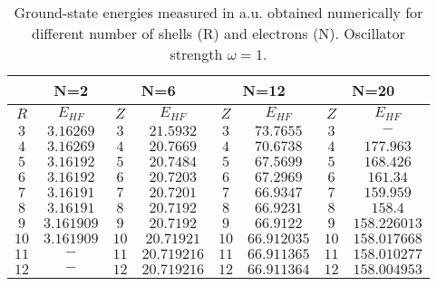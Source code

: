 \documentclass[twoside,english]{uiofysmaster}
\theoremstyle{definition}
\begin{document}
\begin{table}[h!]
	\begin{center}
		\begin{tabular}{|c c| c c| c c| c c|}
			\hline
			\multirow{2}{*}{} & 
			\multicolumn{1}{c}{N=2} \vline& 
			\multicolumn{2}{c}{N=6} \vline&
			\multicolumn{2}{c}{N=12} \vline&
			\multicolumn{2}{c}{N=20} \vline\\
			\hline
			$R$  & $E_{HF}$ & $Z$ & $E_{HF}$ & $Z$  & $E_{HF}$ &$Z$ &  $E_{HF}$  \\
			\hline
			$  3 $   & $3.16269$  &$ 3 $  & $21.5932$    &$  3 $   & $73.7655$     &$ 3$  & $-          $   \\
			$  4 $   & $3.16269$  &$ 4 $  & $20.7669$    &$  4 $   & $70.6738$     &$ 4$  & $177.963    $   \\
			$  5 $   & $3.16192$  &$ 5 $  & $20.7484$    &$  5 $   & $67.5699$     &$ 5$  & $168.426    $   \\
			$  6 $   & $3.16192$  &$ 6 $  & $20.7203$    &$  6 $   & $67.2969$     &$ 6$  & $161.34     $   \\
			$  7 $   & $3.16191$  &$ 7 $  & $20.7201$    &$  7 $   & $66.9347$     &$ 7$  & $159.959    $   \\
			$  8 $   & $3.16191$  &$ 8 $  & $20.7192$    &$  8 $   & $66.9231$     &$ 8$  & $158.4      $   \\
			$  9 $   & $3.161909$ &$ 9 $  & $20.7192$    &$  9 $   & $66.9122$     &$ 9$  & $158.226013 $   \\
			$  10$   & $3.161909$ &$ 10$  & $20.71921$   &$  10$   & $66.912035$   &$ 10$ & $158.017668 $   \\
			$  11$   & $-       $ &$ 11$  & $20.719216$  &$  11$   & $66.911365$   &$ 11$ & $158.010277 $   \\
			$  12$   & $-       $ &$ 12$  & $20.719216$  &$  12$   & $66.911364$   &$ 12$ & $158.004953 $   \\
			\hline                                                                                    
		\end{tabular}
		 \caption{ Ground-state energies measured in a.u. obtained numerically for different number of shells (R) and electrons (N).  Oscillator strength $\omega=1$.}   \label{tab:resultsHF}
	\end{center}
\end{table}
\end{document}

